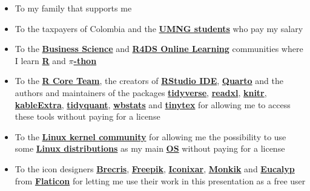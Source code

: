 \documentclass[
  ignorenonframetext,
]{beamer}
\providecommand{\tightlist}{%
  \setlength{\itemsep}{0pt}\setlength{\parskip}{0pt}}\usepackage{longtable,booktabs,array}
\begin{document}
\begin{frame}{}
\label{section-19}
\begin{itemize}
\item
  To my family that supports me
\item
  To the taxpayers of Colombia and the
  \href{https://www.umng.edu.co/estudiante}{\textbf{UMNG students}} who
  pay my salary
\item
  To the \href{https://www.business-science.io/}{\textbf{Business
  Science}} and \href{https://www.rfordatasci.com/}{\textbf{R4DS Online
  Learning}} communities where I learn
  \href{https://www.r-project.org/about.html}{\textbf{R}} and
  \href{https://www.python.org/about/}{\textbf{\(\pi\)-thon}}
\item
  To the \href{https://www.r-project.org/contributors.html}{\textbf{R
  Core Team}}, the creators of
  \href{https://rstudio.com/products/rstudio/}{\textbf{RStudio IDE}},
  \href{https://quarto.org/}{\textbf{Quarto}} and the authors and
  maintainers of the packages
  \href{https://CRAN.R-project.org/package=tidyverse}{\textbf{tidyverse}},
  \href{https://CRAN.R-project.org/package=readxl}{\textbf{readxl}},
  \href{https://CRAN.R-project.org/package=knitr}{\textbf{knitr}},
  \href{https://CRAN.R-project.org/package=kableExtra}{\textbf{kableExtra}},
  \href{https://CRAN.R-project.org/package=tidyquant}{\textbf{tidyquant}},
  \href{https://CRAN.R-project.org/package=wbstats}{\textbf{wbstats}}
  and
  \href{https://CRAN.R-project.org/package=tinytex}{\textbf{tinytex}}
  for allowing me to access these tools without paying for a license
\item
  To the \href{https://www.kernel.org/category/about.html}{\textbf{Linux
  kernel community}} for allowing me the possibility to use some
  \href{https://static.lwn.net/Distributions/}{\textbf{Linux
  distributions}} as my main
  \href{https://en.wikipedia.org/wiki/Operating_system}{\textbf{OS}}
  without paying for a license
\end{itemize}
\end{frame}

\begin{frame}{}
\label{section-20}
\begin{itemize}
\tightlist
\item
  To the icon designers
  \href{https://www.flaticon.com/authors/becris}{\textbf{Brecris}},
  \href{https://www.flaticon.com/authors/freepik}{\textbf{Freepik}},
  \href{https://www.flaticon.com/authors/iconixar}{\textbf{Iconixar}},
  \href{https://www.flaticon.com/authors/monkik}{\textbf{Monkik}} and
  \href{https://www.flaticon.com/authors/eucalyp}{\textbf{Eucalyp}} from
  \href{https://www.flaticon.com/}{\textbf{Flaticon}} for letting me use
  their work in this presentation as a free user
\end{itemize}
\end{frame}
\end{document}

